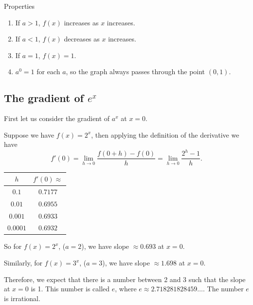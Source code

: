 \begin{thing}{Properties}
\begin{enumerate}
 \item[ ] If $a>1$, $f(x)$ increases as $x$ increases.
 \item[ ] If $a<1$, $f(x)$ decreases as $x$ increases.
 \item[ ] If $a=1$, $f(x)=1$.
 \item[ ] $a^0=1$ for each $a$, so the graph always passes through the point $(0,1)$.
\end{enumerate}
\end{thing}
 
\subsection{The gradient of $e^x$}
First let us consider the gradient of $a^x$ at $x=0$. 
\begin{example}
Suppose we have $f(x)=2^x$, then applying the definition of the derivative we have
\[f'(0)=\lim_{h\to0}\frac{f(0+h)-f(0)}{h}=\lim_{h\to0}\frac{2^h-1}{h}.\]
\begin{center}
    \begin{tabular}{ | c | c | }
    \hline
    $h$  & $f'(0)\approx$ \\ \hline
    $0.1$ & $0.7177$ \\ \hline
    $0.01$ & $0.6955$ \\ \hline
    $0.001$ & $0.6933$ \\ \hline
    $0.0001$ & $0.6932$ \\ \hline
    \end{tabular}
\end{center}
So for $f(x)=2^x$, ($a=2$), we have slope $\approx0.693$ at $x=0$.
 
Similarly, for $f(x)=3^x$, ($a=3$), we have slope $\approx 1.698$ at $x=0$.
\end{example}

Therefore, we expect that there is a number between 2 and 3 such that the slope at $x=0$ is 1. This number is called $e$, where $e\approx2.718281828459\dots$. The number $e$ is irrational.

